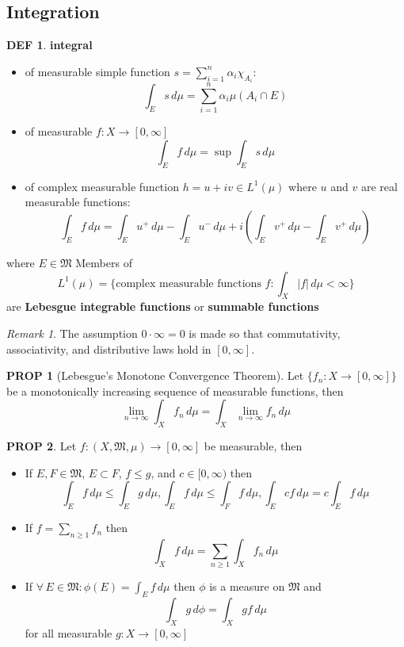 \documentclass[hidelinks,10pt]{article}
\theoremstyle{definition}
\newtheorem*{defin}{DEF}
\theoremstyle{dotles}
\theoremstyle{dotless}
\newtheorem{proposition}{PROP}[section]
\theoremstyle{remark}
\newtheorem*{remark}{Remark}
\begin{document}
\subsection{Integration}

\begin{defin}
\textbf{integral}\begin{itemize}
    \item of measurable simple function $s=\sum_{i=1}^n\alpha_i\chi_{A_i}$:
    \[\int_Es\,d\mu=\sum\limits_{i=1}^n\alpha_i\mu(A_i\cap E)\]
    \item of measurable $f:X\to[0,\infty]$
    \[\int_Ef\,d\mu=\sup\int_Es\,d\mu\]
    \item of complex measurable function $h=u+iv\in L^1(\mu)$ where $u$ and $v$ are real measurable functions:
    \[\int_Ef\,d\mu=\int_Eu^+\,d\mu-\int_Eu^-\,d\mu+i\left(\int_Ev^+\,d\mu-\int_Ev^+\,d\mu\right)\]
\end{itemize}
where $E\in\mathfrak{M}$\bigbreak
Members of
\[L^1(\mu)=\{\textrm{complex measurable functions }f:\int_X|f|\,d\mu<\infty\}\]
are \textbf{Lebesgue integrable functions} or \textbf{summable functions}
\end{defin}

\begin{remark}
The assumption $0\cdot\infty=0$ is made so that commutativity, associativity, and distributive laws hold in $[0,\infty]$.
\end{remark}

\begin{proposition}[Lebesgue's Monotone Convergence Theorem]
Let $\{f_n:X\to[0,\infty]\}$ be a monotonically increasing sequence of measurable functions, then
\[\lim_{n\to\infty}\int_Xf_n\,d\mu=\int_X\lim_{n\to\infty}f_n\,d\mu\]
\end{proposition}

\begin{proposition}
Let $f:(X,\mathfrak{M},\mu)\to[0,\infty]$ be measurable, then\begin{itemize}
    \item If $E,F\in\mathfrak{M}$, $E\subset F$, $f\leq g$, and $c\in[0,\infty)$ then
    \[\int_Ef\,d\mu\leq\int_Eg\,d\mu,\int_Ef\,d\mu\leq\int_Ff\,d\mu,\int_Ecf\,d\mu=c\int_Ef\,d\mu\]
    \item If $f=\sum_{n\geq1}f_n$ then
    \[\int_Xf\,d\mu=\sum_{n\geq1}\int_Xf_n\,d\mu\]
    \item If $\forall\,E\in\mathfrak{M}:\phi(E)=\int_Ef\,d\mu$ then $\phi$ is a measure on $\mathfrak{M}$ and
    \[\int_Xg\,d\phi=\int_Xgf\,d\mu\]
    for all measurable $g:X\to[0,\infty]$
\end{itemize}
\end{proposition}
\end{document}
